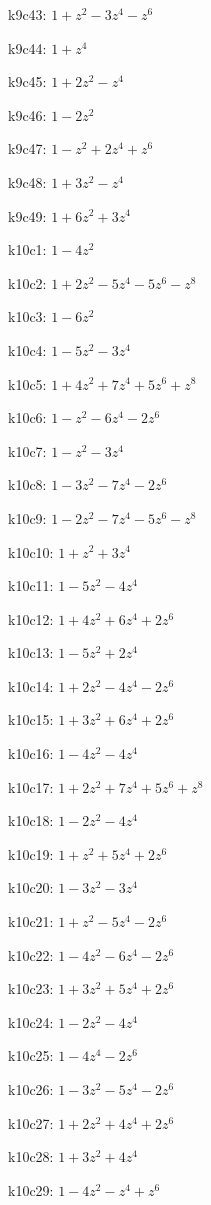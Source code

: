 k9c43: $ 1+z^{2}-3z^{4}-z^{6} $ 

k9c44: $ 1+z^{4} $ 

k9c45: $ 1+2z^{2}-z^{4} $ 

k9c46: $ 1-2z^{2} $ 

k9c47: $ 1-z^{2}+2z^{4}+z^{6} $ 

k9c48: $ 1+3z^{2}-z^{4} $ 

k9c49: $ 1+6z^{2}+3z^{4} $ 

k10c1: $ 1-4z^{2} $ 

k10c2: $ 1+2z^{2}-5z^{4}-5z^{6}-z^{8} $ 

k10c3: $ 1-6z^{2} $ 

k10c4: $ 1-5z^{2}-3z^{4} $ 

k10c5: $ 1+4z^{2}+7z^{4}+5z^{6}+z^{8} $ 

k10c6: $ 1-z^{2}-6z^{4}-2z^{6} $ 

k10c7: $ 1-z^{2}-3z^{4} $ 

k10c8: $ 1-3z^{2}-7z^{4}-2z^{6} $ 

k10c9: $ 1-2z^{2}-7z^{4}-5z^{6}-z^{8} $ 

k10c10: $ 1+z^{2}+3z^{4} $ 

k10c11: $ 1-5z^{2}-4z^{4} $ 

k10c12: $ 1+4z^{2}+6z^{4}+2z^{6} $ 

k10c13: $ 1-5z^{2}+2z^{4} $ 

k10c14: $ 1+2z^{2}-4z^{4}-2z^{6} $ 

k10c15: $ 1+3z^{2}+6z^{4}+2z^{6} $ 

k10c16: $ 1-4z^{2}-4z^{4} $ 

k10c17: $ 1+2z^{2}+7z^{4}+5z^{6}+z^{8} $ 

k10c18: $ 1-2z^{2}-4z^{4} $ 

k10c19: $ 1+z^{2}+5z^{4}+2z^{6} $ 

k10c20: $ 1-3z^{2}-3z^{4} $ 

k10c21: $ 1+z^{2}-5z^{4}-2z^{6} $ 

k10c22: $ 1-4z^{2}-6z^{4}-2z^{6} $ 

k10c23: $ 1+3z^{2}+5z^{4}+2z^{6} $ 

k10c24: $ 1-2z^{2}-4z^{4} $ 

k10c25: $ 1-4z^{4}-2z^{6} $ 

k10c26: $ 1-3z^{2}-5z^{4}-2z^{6} $ 

k10c27: $ 1+2z^{2}+4z^{4}+2z^{6} $ 

k10c28: $ 1+3z^{2}+4z^{4} $ 

k10c29: $ 1-4z^{2}-z^{4}+z^{6} $ 


